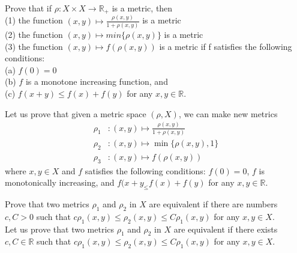 \documentclass[document]{article}
\begin{document}
\begin{problem}[4.33] Prove that if $\rho:X \times X \rightarrow \mathbb{R}_+$ is a metric, then\\
(1) the function $(x,y) \mapsto \frac{\rho(x,y)}{1+\rho(x,y)}$ is a metric\\
(2) the function $(x,y) \mapsto min\{\rho(x,y)\}$ is a metric\\
(3) the function $(x,y) \mapsto f(\rho(x,y))$ is a metric if f satisfies the following conditions:\\

(a) $f(0) = 0$\\

(b) $f$ is a monotone increasing function, and\\

(c) $f(x+y) \leq f(x) + f(y)$ for any $x,y \in \mathbb{R}$.


Let us prove that given a metric space $(\rho, X)$, we can make new metrics
\begin{align}
    \rho_1 &: (x,y) \mapsto \frac{\rho(x,y)}{1+\rho(x,y)}\\
    \rho_2 &: (x,y) \mapsto \min \{\rho(x,y),1\}\\
    \rho_3 &: (x,y) \mapsto f(\rho(x,y))
\end{align}
where $x,y \in X$ and $f$ satisfies the following conditions: $f(0)=0$, $f$ is monotonically increasing, and $f(x+y_ \leq f(x)+f(y)$ for any $x,y \in \mathbb{R}$.
\end{problem}

\begin{problem}[4.27] Prove that two metrics $\rho_1$ and $\rho_2$ in $X$ are equivalent if there are numbers $c,C > 0$ such that $c\rho_1(x,y) \leq \rho_2(x,y) \leq C\rho_1(x,y)$ for any $x,y \in X$.\\


Let us prove that two metrics $\rho_1$ and $\rho_2$ in $X$ are equivalent if there exists $c, C \in \mathbb{R}$ such that $c\rho_1(x,y) \leq \rho_2 (x,y) \leq C \rho_1 (x,y)$ for any $x,y \in X$.
\end{problem}
\end{document}
